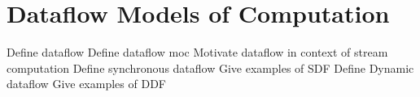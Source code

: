 \chapter{Dataflow Models of Computation}
\label{chapter:dataflow}

Define dataflow
Define dataflow moc
Motivate dataflow in context of stream computation
Define synchronous dataflow
Give examples of SDF
Define Dynamic dataflow
Give examples of DDF

